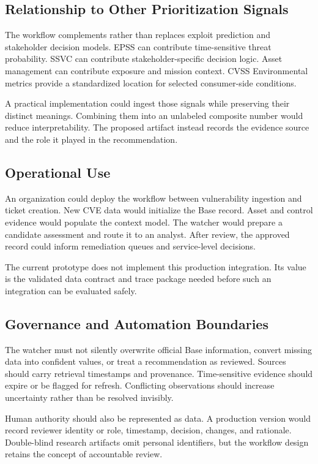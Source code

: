 \documentclass[conference]{IEEEtran}
\begin{document}
\subsection{Relationship to Other Prioritization Signals}

The workflow complements rather than replaces exploit prediction and
stakeholder decision models. EPSS can contribute time-sensitive threat
probability. SSVC can contribute stakeholder-specific decision logic. Asset
management can contribute exposure and mission context. CVSS Environmental
metrics provide a standardized location for selected consumer-side conditions.

A practical implementation could ingest those signals while preserving their
distinct meanings. Combining them into an unlabeled composite number would
reduce interpretability. The proposed artifact instead records the evidence
source and the role it played in the recommendation.

\subsection{Operational Use}

An organization could deploy the workflow between vulnerability ingestion and
ticket creation. New CVE data would initialize the Base record. Asset and
control evidence would populate the context model. The watcher would prepare a
candidate assessment and route it to an analyst. After review, the approved
record could inform remediation queues and service-level decisions.

The current prototype does not implement this production integration. Its
value is the validated data contract and trace package needed before such an
integration can be evaluated safely.

\subsection{Governance and Automation Boundaries}

The watcher must not silently overwrite official Base information, convert
missing data into confident values, or treat a recommendation as reviewed.
Sources should carry retrieval timestamps and provenance. Time-sensitive
evidence should expire or be flagged for refresh. Conflicting observations
should increase uncertainty rather than be resolved invisibly.

Human authority should also be represented as data. A production version
would record reviewer identity or role, timestamp, decision, changes, and
rationale. Double-blind research artifacts omit personal identifiers, but the
workflow design retains the concept of accountable review.
\end{document}
